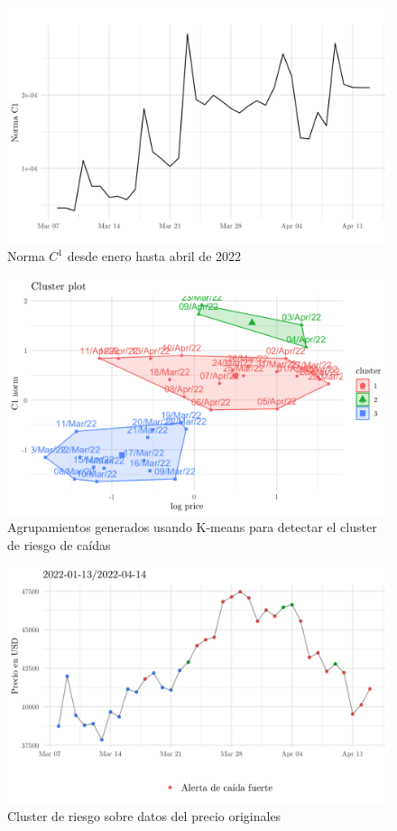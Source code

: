 \begin{figure}
	\centering
	\includegraphics[scale=0.3]{Chapter5/norma_c1_3meses.png}
	\caption{Norma $C^1$ desde enero hasta abril de 2022}
	\label{fig24}
\end{figure}

\begin{figure}[h!]
	\centering
	\includegraphics[scale=0.3]{Chapter5/cluster_riesgo.png}
	\caption{Agrupamientos generados usando K-means para detectar el cluster de riesgo de caídas}
	\label{fig25}
\end{figure}

\begin{figure}[h!]
	\centering
	\includegraphics[scale=0.3]{Chapter5/pred_TDA.png}
	\caption{Cluster de riesgo sobre datos del precio originales}
	\label{fig26}
\end{figure}


